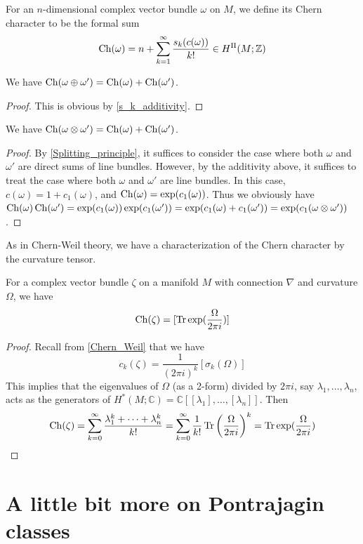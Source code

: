 	\begin{defn}
		For an $n$-dimensional complex vector bundle $\omega$ on $M$, we define its Chern character to be the formal sum
		\[ \operatorname{\mathrm{Ch}}(\omega)=n+\sum_{k=1}^\infty\frac{s_k(c(\omega))}{k!}\in H^\Pi(M;\mathbb{Z}) \]
	\end{defn}
	\begin{thm}\label{Chern_char_additivity}
		We have $\operatorname{\mathrm{Ch}}(\omega\oplus\omega')=\operatorname{\mathrm{Ch}}(\omega)+\operatorname{\mathrm{Ch}}(\omega')$. 
	\end{thm}
	\begin{proof}
		This is obvious by \cref{s_k_additivity}. 
	\end{proof}
	\begin{thm}\label{Chern_char_multiplicativity}
		We have $\operatorname{\mathrm{Ch}}(\omega\otimes\omega')=\operatorname{\mathrm{Ch}}(\omega)+\operatorname{\mathrm{Ch}}(\omega')$. 
	\end{thm}
	\begin{proof}
		By \cref{Splitting_principle}, it suffices to consider the case where both $\omega$ and $\omega'$ are direct sums of line bundles. However, by the additivity above, it suffices to treat the case where both $\omega$ and $\omega'$ are line bundles. In this case, $c(\omega)=1+c_1(\omega)$, and $\operatorname{\mathrm{Ch}}(\omega)=\exp(c_1(\omega))$. Thus we obviously have
		$\operatorname{\mathrm{Ch}}(\omega)\operatorname{\mathrm{Ch}}(\omega')=\exp(c_1(\omega))\exp(c_1(\omega'))=\exp(c_1(\omega)+c_1(\omega'))=\exp(c_1(\omega\otimes\omega'))$. 
	\end{proof}
	As in Chern-Weil theory, we have a characterization of the Chern character by the curvature tensor. 
	\begin{thm}\label{Chern_characteristic_curvature}
		For a complex vector bundle $\zeta$ on a manifold $M$ with connection $\nabla$ and curvature $\Omega$, we have
		\[ \operatorname{\mathrm{Ch}}(\zeta)=[\operatorname{\mathrm{Tr}}\exp(\frac{\Omega}{2\pi i})] \]
	\end{thm}
	\begin{proof}
		Recall from \cref{Chern_Weil} that we have
		\[ c_k(\zeta)=\frac{1}{(2\pi i)^k}[\sigma_k(\Omega)] \]
		This implies that the eigenvalues of $\Omega$ (as a 2-form) divided by $2\pi i$, say $\lambda_1,\dots,\lambda_n$, acts as the generators of $H^*(M;\mathbb{C})=\mathbb{C}\left[[\lambda_1],\dots,[\lambda_n]\right]$. 
		Then 
		\[ \operatorname{\mathrm{Ch}}(\zeta)=\sum_{k=0}^\infty\frac{\lambda_1^k+\cdots+\lambda_n^k}{k!}=\sum_{k=0}^\infty\frac{1}{k!}\operatorname{\mathrm{Tr}}\left(\frac{\Omega}{2\pi i}\right)^k=\operatorname{\mathrm{Tr}}\exp(\frac{\Omega}{2\pi i}) \]
	\end{proof}
	
\chapter{A little bit more on Pontrajagin classes}

